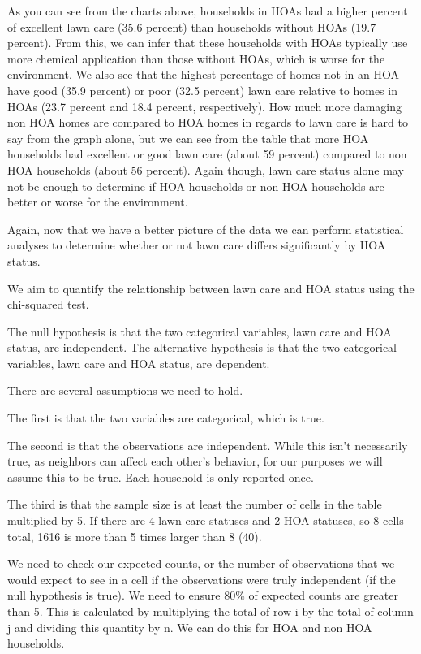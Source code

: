 \documentclass{article}
\begin{document}
As you can see from the charts above, households in HOAs had a higher percent of excellent lawn care (35.6 percent) than households without HOAs (19.7 percent). From this, we can infer that these households with HOAs typically use more chemical application than those without HOAs, which is worse for the environment. We also see that the highest percentage of homes not in an HOA have good (35.9 percent) or poor (32.5 percent) lawn care relative to homes in HOAs (23.7 percent and 18.4 percent, respectively). How much more damaging non HOA homes are compared to HOA homes in regards to lawn care is hard to say from the graph alone, but we can see from the table that more HOA households had excellent or good lawn care (about 59 percent) compared to non HOA households (about 56 percent). Again though, lawn care status alone may not be enough to determine if HOA households or non HOA households are better or worse for the environment. 

Again, now that we have a better picture of the data we can perform statistical analyses to determine whether or not lawn care differs significantly by HOA status. 

We aim to quantify the relationship between lawn care and HOA status using the chi-squared test.

The null hypothesis is that the two categorical variables, lawn care and HOA status, are independent.
The alternative hypothesis is that the two categorical variables, lawn care and HOA status, are dependent. 

There are several assumptions we need to hold. 

The first is that the two variables are categorical, which is true.

The second is that the observations are independent. While this isn't necessarily true, as neighbors can affect each other's behavior, for our purposes we will assume this to be true. Each household is only reported once. 

The third is that the sample size is at least the number of cells in the table multiplied by 5. If there are 4 lawn care statuses and 2 HOA statuses, so 8 cells total, 1616 is more than 5 times larger than 8 (40). 

We need to check our expected counts, or the number of observations that we would expect to see in a cell if the observations were truly independent (if the null hypothesis is true). We need to ensure 80\% of expected counts are greater than 5. This is calculated by multiplying the total of row i by the total of column j and dividing this quantity by n. We can do this for HOA and non HOA households. 
\end{document}
